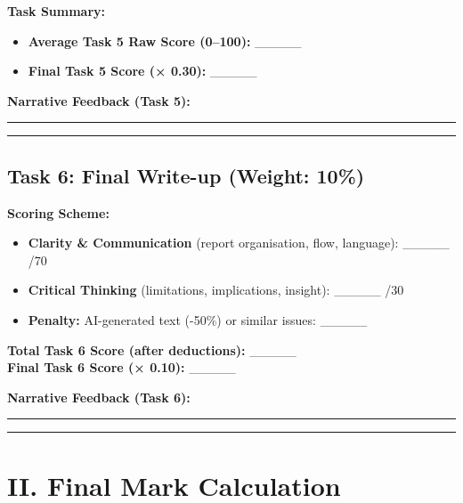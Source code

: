\documentclass[
  10pt,
]{article}
\providecommand{\tightlist}{%
  \setlength{\itemsep}{0pt}\setlength{\parskip}{0pt}}
\begin{document}
\textbf{Task Summary:}

\begin{itemize}
\tightlist
\item
  \textbf{Average Task 5 Raw Score (0--100):} \_\_\_\_\_\\
\item
  \textbf{Final Task 5 Score (× 0.30):} \_\_\_\_\_
\end{itemize}

\textbf{Narrative Feedback (Task 5):}

\begin{center}\rule{0.5\linewidth}{0.5pt}\end{center}

\begin{center}\rule{0.5\linewidth}{0.5pt}\end{center}

\subsection{Task 6: Final Write-up (Weight:
10\%)}\label{task-6-final-write-up-weight-10}

\textbf{Scoring Scheme:}

\begin{itemize}
\tightlist
\item
  \textbf{Clarity \& Communication} (report organisation, flow,
  language): \_\_\_\_\_ /70\\
\item
  \textbf{Critical Thinking} (limitations, implications, insight):
  \_\_\_\_\_ /30\\
\item
  \textbf{Penalty:} AI-generated text (-50\%) or similar issues:
  \_\_\_\_\_
\end{itemize}

\textbf{Total Task 6 Score (after deductions):} \_\_\_\_\_\\
\textbf{Final Task 6 Score (× 0.10):} \_\_\_\_\_

\textbf{Narrative Feedback (Task 6):}

\begin{center}\rule{0.5\linewidth}{0.5pt}\end{center}

\begin{center}\rule{0.5\linewidth}{0.5pt}\end{center}

\section{II. Final Mark Calculation}\label{ii.-final-mark-calculation}
\end{document}
